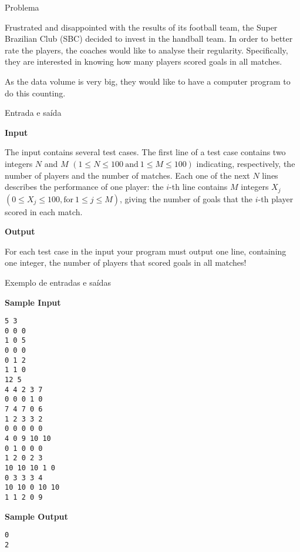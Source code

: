 
\begin{frame}[fragile]{Problema}

Frustrated and disappointed with the results of its football team, the Super Brazilian Club (SBC)
decided to invest in the handball team. In order to better rate the players, the coaches would like to
analyse their regularity. Specifically, they are interested in knowing how many players scored goals in
all matches.

As the data volume is very big, they would like to have a computer program to do this counting.

\end{frame}

\begin{frame}[fragile]{Entrada e saída}

\textbf{Input}

The input contains several test cases. The first line of a test case contains two integers $N$ and 
$M$ $(1\leq N\leq 100\ \mbox{and}\ 1\leq M\leq 100)$ indicating, respectively, the number of players and the number of matches. Each one of the next $N$ lines describes the performance of one player: 
the $i$-th line contains $M$ integers $X_j$ $(0\leq X_j\leq 100, \mbox{for}\ 1\leq j\leq M)$, 
giving the number of goals that the $i$-th player scored in each match.

\textbf{Output}

For each test case in the input your program must output one line, containing one integer, the number
of players that scored goals in all matches!

\end{frame}


\begin{frame}[fragile]{Exemplo de entradas e saídas}

\begin{scriptsize}
\begin{minipage}[t]{0.6\textwidth}
\textbf{Sample Input}
\begin{verbatim}
5 3
0 0 0
1 0 5
0 0 0
0 1 2
1 1 0
12 5
4 4 2 3 7
0 0 0 1 0
7 4 7 0 6
1 2 3 3 2
0 0 0 0 0
4 0 9 10 10
0 1 0 0 0
1 2 0 2 3
10 10 10 1 0
0 3 3 3 4
10 10 0 10 10
1 1 2 0 9
\end{verbatim}
\end{minipage}
\begin{minipage}[t]{0.35\textwidth}
\textbf{Sample Output}
\begin{verbatim}
0
2
\end{verbatim}
\end{minipage}
\end{scriptsize}

\end{frame}

